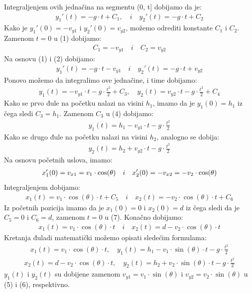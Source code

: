 \documentclass{article}
\begin{document}
Integraljenjem ovih jednačina na segmentu (0, t] dobijamo da je:
\begin{align}
      y_1'(t) = -g \cdot t + C_1, \quad i \quad y_2'(t) = -g \cdot t + C_2  \tag {1}
\end{align}
Kako je $y_1'(0) = -v_{y1}$ i $y_2'(0) = v_{y2}$, možemo odrediti konstante $C_1$ i $C_2$. 
\newline Zamenom $t = 0$ u (1) dobijamo:
\begin{align}
  C_1=-v_{y1} \quad i \quad C_2=v_{y2}  \tag {2}
\end{align}
Na osnovu (1) i (2) dobijamo: 
\begin{align}
        y_1'(t) = -g \cdot t - v_{y1} \quad i \quad y_2'(t) = -g \cdot t + v_{y2} \tag {3}
\end{align}
Ponovo možemo da integralimo ove jednačine, i time dobijamo:
\begin{align}
        y_1(t) = - v_{y1} \cdot t - g \cdot \frac{t^2}{2} + C_3 , \quad y_2(t) =v_{y2} \cdot t - g \cdot \frac{t^2}{2} + C_4 \tag {4}
\end{align}
Kako se prvo đule na početku nalazi na visini $h_1$, imamo da je $y_1(0) = h_1$ iz čega sledi $C_3=h_1$. 
\newline
Zamenom $C_3$ u (4) dobijamo:
\begin{align}
    y_1(t) = h_1 - v_{y1} \cdot t - g \cdot \frac{t^2}{2} \tag {5}
\end{align}
Kako se drugo đule na početku nalazi na visini $h_2$, analogno se dobija:
\begin{align}
    y_2(t) = h_2 + v_{y2} \cdot t - g \cdot \frac{t^2}{2} \tag {6}
\end{align}
Na osnovu početnih uslova, imamo: 
\begin{align}
    x_1'(0) = v_{x1} = v_1 \cdot \cos(\theta) \quad i \quad x_2'(0) = -v_{x2} = - v_2 \cdot \cos(\theta) \notag 
\end{align}
Integraljenjem dobijamo: 
\begin{align}
    x_1(t) = v_1 \cdot \cos(\theta) \cdot t + C_5 \quad i \quad x_2(t) =  -v_2 \cdot \cos(\theta) \cdot t + C_6 \tag {7}
\end{align}
Iz početnih pozicija imamo da je $x_1(0) = 0$ i $x_2(0) = d$ iz čega sledi da je $C_5 = 0$ i $C_6 = d$, zamenom $t = 0$ u (7).
\newline
\newline
Konačno dobijamo:
\begin{align}
    x_1(t) = v_1 \cdot \cos(\theta) \cdot t \quad i \quad x_2(t) = d - v_2 \cdot \cos(\theta) \cdot t  \tag {8}
\end{align}
Kretanja đuladi matematički možemo opisati sledećim formulama:
\begin{align}
    x_1(t) = v_1 \cdot \cos(\theta) \cdot t, \quad y_1(t) = h_1 - v_1 \cdot \sin(\theta) \cdot t - g \cdot \frac{t^2}{2} \tag {9}
\end{align}
\begin{align}
    x_2(t) = d - v_2 \cdot \cos(\theta) \cdot t , \quad
    y_2(t) = h_2 + v_2 \cdot \sin(\theta) \cdot t - g \cdot \frac{t^2}{2} \tag {10}
\end{align}
$y_1(t)$ i $y_2(t)$ su dobijene zamenom $v_{y1} = v_1 \cdot \sin(\theta)$ i $v_{y2} = v_2 \cdot \sin(\theta)$ u (5) i (6), respektivno.
\newpage
\end{document}
